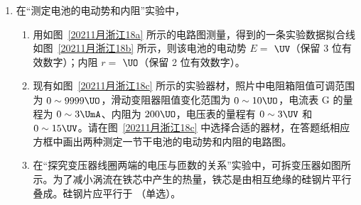 \documentclass[\gkver]{gaokaozhenti}
\begin{document}
\begin{enumerate}
{D．然后挂上盘与砝码 $m$，根据牛顿第二定律 $mg - T = ma$
对小车 $M$，根据牛顿第二定律 $T = Ma$
两式相比解得绳子拉力 $T = \frac{M}{M + m}mg = \frac{1}{1 + \frac{m}{M}}mg$
当满足盘和砝码的总质量远小于小车的质量，即 $T = mg$，盘和砝码的重力可当作牵引力，D 正确；

B．实验过程中摩擦阻力无法消除，本实验装置无法验证“机械能守恒定律”，故 B 错误；

C．细线与长木板平行才能保证绳子的拉力与小车运动方向一致，这样盘和砝码的重力可完全当作牵引力，C 正确。

故选 ACD。

（2）小车做匀加速直线运动，位移逐渐增大，所以实验打出的纸带是第Ⅱ条。

（3）根据动能定理可知 $W = \frac{1}{2}Mv^{2}$，图像的斜率为 $\frac{1}{2}M$，据 $W-v^{2}$ 图像能求出小车的质量。

（4）光路图如图所示


根据折射定律可知 $n = \frac{\sin i}{\sin r}$。
}

\item
在“测定电池的电动势和内阻”实验中，

\begin{enumerate}
	\item
	用如图~\ref{20211月浙江18a} 所示的电路图测量，得到的一条实验数据拟合线如图~\ref{20211月浙江18b} 所示，则该电池的电动势 $E =$  $\UV$（保留 3 位有效数字）；内阻 $r =$  $\UO$（保留 2 位有效数字）。


	\item
	现有如图~\ref{20211月浙江18c} 所示的实验器材，照片中电阻箱阻值可调范围为 $0 \sim 9999 \UO$，滑动变阻器阻值变化范围为 $0 \sim 10 \UO$，电流表 G 的量程为 $0 \sim 3 \UmA$、内阻为 $200 \UO$，电压表的量程有 $0 \sim 3 \UV$ 和 $0 \sim 15 \UV$。请在图~\ref{20211月浙江18c} 中选择合适的器材，在答题纸相应方框中画出两种测定一节干电池的电动势和内阻的电路图。

	\item
	在“探究变压器线圈两端的电压与匝数的关系”实验中，可拆变压器如图所示。为了减小涡流在铁芯中产生的热量，铁芯是由相互绝缘的硅钢片平行叠成。硅钢片应平行于 （单选）。


\end{enumerate}
\end{enumerate}
\end{document}
